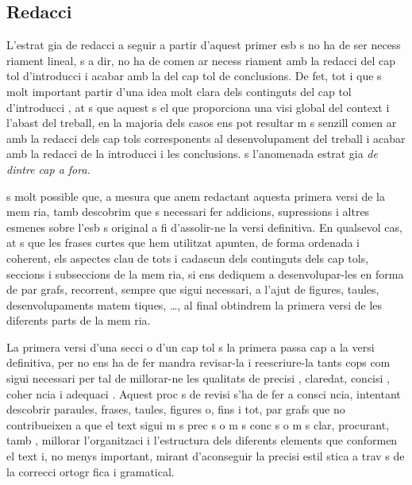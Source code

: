 \subsection{Redacci } L'estrat gia de redacci  a seguir a partir d'aquest primer esb s no ha de ser necess riament lineal,  s a dir, no ha de comen ar necess riament amb la redacci  del cap tol d'introducci  i acabar amb la del cap tol de conclusions. De fet, tot i que  s molt important partir d'una idea molt clara dels continguts del cap tol d'introducci , at s que aquest  s el que proporciona una visi  global del context i l'abast del treball, en la majoria dels casos ens pot resultar m s senzill comen ar amb la redacci  dels cap tols corresponents al desenvolupament del treball i acabar amb la redacci  de la introducci  i les conclusions.  s l'anomenada estrat gia \emph{de dintre cap a fora}.

 s molt possible que, a mesura que anem redactant aquesta primera versi  de la mem ria, tamb  descobrim que  s necessari fer addicions, supressions i altres esmenes sobre l'esb s original a fi d'assolir-ne la versi  definitiva. En qualsevol cas, at s que les frases curtes que hem utilitzat apunten, de forma ordenada i coherent, els aspectes clau de tots i cadascun dels continguts dels cap tols, seccions i subseccions de la mem ria, si ens dediquem a desenvolupar-les en forma de par grafs, recorrent, sempre que sigui necessari, a l'ajut de figures, taules, desenvolupaments matem tiques, \ldots, al final obtindrem la primera versi  de les diferents parts de la mem ria.

La primera versi  d'una secci  o d'un cap tol  s la primera passa cap a la versi  definitiva, per  no ens ha de fer mandra revisar-la i reescriure-la tants cops com sigui necessari per tal de millorar-ne les qualitats de precisi , claredat, concisi , coher ncia i adequaci . Aquest proc s de revisi  s'ha de fer a consci ncia, intentant descobrir paraules, frases, taules, figures o, fins i tot, par grafs que no contribueixen a que el text sigui m s prec s o m s conc s o m s clar, procurant, tamb , millorar l'organitzaci  i l'estructura dels diferents elements que conformen el text i, no menys important, mirant d'aconseguir la precisi  estil stica a trav s de la correcci  ortogr fica i gramatical.

